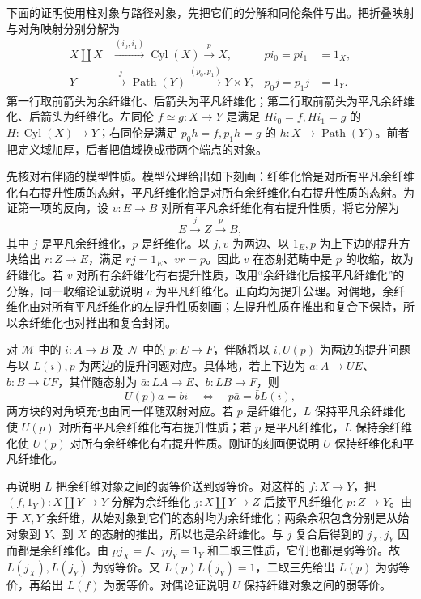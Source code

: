 \ProseParagraphBreak
下面的证明使用柱对象与路径对象，先把它们的分解和同伦条件写出。把折叠映射与对角映射分别分解为
\[
	\begin{aligned}
		X\amalg X&\xrightarrow{(i_0,i_1)}\operatorname{Cyl}(X)\xrightarrow{p}X, &p i_0=p i_1&=1_X,\\
		Y&\xrightarrow{j}\operatorname{Path}(Y)\xrightarrow{(p_0,p_1)}Y\times Y, &p_0j=p_1j&=1_Y.
	\end{aligned}
\]
第一行取前箭头为余纤维化、后箭头为平凡纤维化；第二行取前箭头为平凡余纤维化、后箭头为纤维化。左同伦 \(f\simeq g:X\to Y\) 是满足 \(Hi_0=f,Hi_1=g\) 的 \(H:\operatorname{Cyl}(X)\to Y\)；右同伦是满足 \(p_0h=f,p_1h=g\) 的 \(h:X\to\operatorname{Path}(Y)\)。前者把定义域加厚，后者把值域换成带两个端点的对象。
\begin{proofsketch}
	先核对右伴随的模型性质。模型公理给出如下刻画：纤维化恰是对所有平凡余纤维化有右提升性质的态射，平凡纤维化恰是对所有余纤维化有右提升性质的态射。为证第一项的反向，设 \(v:E\to B\) 对所有平凡余纤维化有右提升性质，将它分解为
	\[
		E\xrightarrow{j}Z\xrightarrow{p}B,
	\]
	其中 \(j\) 是平凡余纤维化，\(p\) 是纤维化。以 \(j,v\) 为两边、以 \(1_E,p\) 为上下边的提升方块给出 \(r:Z\to E\)，满足 \(rj=1_E\)、\(vr=p\)。因此 \(v\) 在态射范畴中是 \(p\) 的收缩，故为纤维化。若 \(v\) 对所有余纤维化有右提升性质，改用“余纤维化后接平凡纤维化”的分解，同一收缩论证就说明 \(v\) 为平凡纤维化。正向均为提升公理。对偶地，余纤维化由对所有平凡纤维化的左提升性质刻画；左提升性质在推出和复合下保持，所以余纤维化也对推出和复合封闭。

	对 \(\mathcal M\) 中的 \(i:A\to B\) 及 \(\mathcal N\) 中的 \(p:E\to F\)，伴随将以 \(i,U(p)\) 为两边的提升问题与以 \(L(i),p\) 为两边的提升问题对应。具体地，若上下边为 \(a:A\to UE\)、\(b:B\to UF\)，其伴随态射为 \(\bar a:LA\to E\)、\(\bar b:LB\to F\)，则
	\[
		U(p)a=bi\quad\Longleftrightarrow\quad p\bar a=\bar bL(i),
	\]
	两方块的对角填充也由同一伴随双射对应。若 \(p\) 是纤维化，\(L\) 保持平凡余纤维化使 \(U(p)\) 对所有平凡余纤维化有右提升性质；若 \(p\) 是平凡纤维化，\(L\) 保持余纤维化使 \(U(p)\) 对所有余纤维化有右提升性质。刚证的刻画便说明 \(U\) 保持纤维化和平凡纤维化。

	再说明 \(L\) 把余纤维对象之间的弱等价送到弱等价。对这样的 \(f:X\to Y\)，把 \((f,1_Y):X\amalg Y\to Y\) 分解为余纤维化 \(j:X\amalg Y\to Z\) 后接平凡纤维化 \(p:Z\to Y\)。由于 \(X,Y\) 余纤维，从始对象到它们的态射均为余纤维化；两条余积包含分别是从始对象到 \(Y\)、到 \(X\) 的态射的推出，所以也是余纤维化。与 \(j\) 复合后得到的 \(j_X,j_Y\) 因而都是余纤维化。由 \(pj_X=f\)、\(pj_Y=1_Y\) 和二取三性质，它们也都是弱等价。故 \(L(j_X),L(j_Y)\) 为弱等价。又 \(L(p)L(j_Y)=1\)，二取三先给出 \(L(p)\) 为弱等价，再给出 \(L(f)\) 为弱等价。对偶论证说明 \(U\) 保持纤维对象之间的弱等价。


\end{proofsketch}
